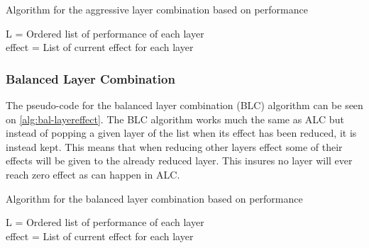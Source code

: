 \begin{algorithm}
    \caption{Algorithm for the aggressive layer combination based on performance}
    \SetAlgoLined
    L = Ordered list of performance of each layer \\
    effect  = List of current effect for each layer \\
    \label{alg:aggresive-layereffect}
\end{algorithm}

\subsubsection{Balanced Layer Combination}
The pseudo-code for the balanced layer combination (BLC) algorithm can be seen on \autoref{alg:bal-layereffect}.
The BLC algorithm works much the same as ALC but instead of popping a given layer of the list when its effect has been reduced, it is instead kept.
This means that when reducing other layers effect some of their effects will be given to the already reduced layer.
This insures no layer will ever reach zero effect as can happen in ALC.

\begin{algorithm}
    \caption{Algorithm for the balanced layer combination based on performance}
    \SetAlgoLined
    L = Ordered list of performance of each layer \\
    effect  = List of current effect for each layer \\
    \label{alg:bal-layereffect}
\end{algorithm}

